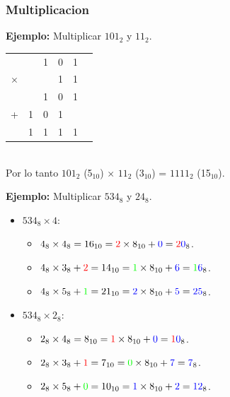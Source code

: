 \documentclass{templateNote}
\begin{document}
\subsubsection{Multiplicacion}

\begin{tcolorbox}[colback=blue!10, colframe=blue!80!black, title={Ejemplo}]
\textbf{Ejemplo:} Multiplicar $101_2$ y $11_2$.
\begin{center}
    \begin{tabular}{c@{}c@{}c@{}c@{}c@{}c}
        & & 1 & 0 & 1 & \\ %
        $\times$ & & & 1 & 1 &  \\ %
        \hline
        & & 1& 0 & 1& \\ %
        + & 1 & 0 & 1 & & \\ %
        \hline
        & 1 & 1 & 1 & 1 &  %
    \end{tabular}
    \\Por lo tanto $101_2$ (5$_{10}$) $\times$ $11_2$ (3$_{10}$) = $1111_2$ (15$_{10}$).
\end{center}

\textbf{Ejemplo:} Multiplicar $534_8$ y $24_8$.
\begin{itemize}
    \item $534_8 \times 4$:
    \begin{itemize}
        \item $4_8 \times 4_8 = 16_{10} = \textcolor{red}{2} \times 8_{10} + \textcolor{blue}{0} = \textcolor{red}{2}\textcolor{blue}{0}_8$. 
        \item $4_8 \times 3_8 + \textcolor{red}{2} = 14_{10} = \textcolor{green}{1} \times 8_{10} + \textcolor{blue}{6} = \textcolor{green}{1}\textcolor{blue}{6}_8$.
        \item $4_8 \times 5_8 + \textcolor{green}{1} = 21_{10} = \textcolor{blue}{2} \times 8_{10} + \textcolor{blue}{5} = \textcolor{blue}{2}\textcolor{blue}{5}_8$.
    \end{itemize}
    \item $534_8 \times 2_8$:
    \begin{itemize}
        \item $2_8 \times 4_8 = 8_{10} = \textcolor{red}{1} \times 8_{10} + \textcolor{blue}{0} = \textcolor{red}{1}\textcolor{blue}{0}_8$.
        \item $2_8 \times 3_8 + \textcolor{red}{1} = 7_{10} = \textcolor{green}{0} \times 8_{10} + \textcolor{blue}{7} = \textcolor{blue}{7}_8$.
        \item $2_8 \times 5_8 + \textcolor{green}{0} = 10_{10} = \textcolor{blue}{1} \times 8_{10} + \textcolor{blue}{2} = \textcolor{blue}{1}\textcolor{blue}{2}_8$.
    \end{itemize}
\end{itemize}


\end{tcolorbox}
\end{document}

